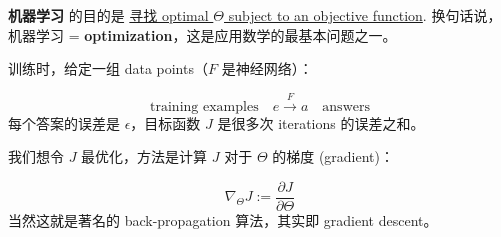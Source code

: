 \documentclass[12pt, orivec]{article}
\newcommand{\cc}[2]{#1}
\newcommand{\cc}[2]{#2}
\begin{document}
\begin{tcolorbox}[breakable, parbox=false, fonttitle=\bfseries, title=Brief review of neural networks]
\cc{\textbf{机器学习} 的目的是 \uline{寻找 optimal $\Theta$ subject to an objective function}.  换句话说，机器学习 = \textbf{optimization}，这是应用数学的最基本问题之一。
}{
The purpose of \textbf{machine learning} is to \uline{find the optimal $\Theta^*$ subject to an objective function}.  In other words, machine learning = \textbf{optimization}, which is one of the most basic problems in applied mathematics.}

\cc{训练时，给定一组 data points（$F$ 是神经网络）：
}{
During training, it is given a set of data points ($F$ is a neural network):}
\begin{equation}
\label{NN-training}
\boxed{\mbox{training examples}} \quad
e \stackrel{F}{\longrightarrow} a
\quad \boxed{\mbox{answers}} 
\end{equation}
\cc{每个答案的误差是 $\epsilon$，目标函数 $J$ 是很多次 iterations 的误差之和。
}{
The error for each answer is $\epsilon$, and the objective function $J$ is the sum of the errors over many iterations.}
\cc{我们想令 $J$ 最优化，方法是计算 $J$ 对于 $\Theta$ 的梯度 (gradient)：
}{
We want to optimize $J$ by calculating the gradient of $J$ w.r.t. $\Theta$:}
\begin{equation}
\nabla_{\Theta} J := \frac{\partial J}{\partial \Theta}
\end{equation}
\cc{当然这就是著名的 back-propagation 算法，其实即 gradient descent。
}{
Of course, this is the famous \textbf{back-propagation} algorithm, which is actually gradient descent.}


\end{tcolorbox}
\end{document}
